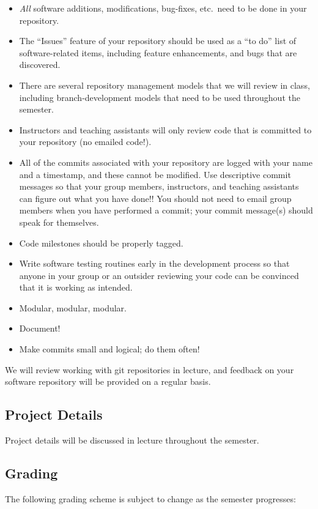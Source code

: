 \begin{itemize}
    \item \emph{All} software additions, modifications, bug-fixes, etc.\ need
        to be done in your repository.
    \item The ``Issues'' feature of your repository should be used as a ``to
        do'' list of software-related items, including feature enhancements,
        and bugs that are discovered.
    \item There are several repository management models that we will review in class,
        including branch-development models that need to be used throughout the semester.
    \item Instructors and teaching assistants will only review code that is committed to your repository (no emailed code!).  
    \item All of the commits associated with your repository are logged with
        your name and a timestamp, and these cannot be modified.  Use
        descriptive commit messages so that your group members, instructors,
        and teaching assistants can figure out what you have done!!  You should not
        need to email group members when you have performed a commit; your
        commit message(s) should speak for themselves.
    \item Code milestones should be properly tagged.
    \item Write software testing routines early in the development process so
        that anyone in your group or an outsider reviewing your code can be
        convinced that it is working as intended.
    \item Modular, modular, modular.
    \item Document!
    \item Make commits small and logical; do them often!
\end{itemize}

We will review working with git repositories in lecture, and feedback
on your software repository will be provided on a regular basis.

\subsection*{Project Details} 
Project details will be discussed in lecture throughout the semester.

\subsection*{Grading} 
The following grading scheme is subject to change as the semester progresses:

